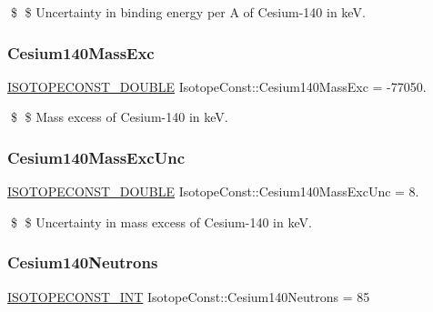 \$ \$ Uncertainty in binding energy per A of Cesium-\/140 in keV. \mbox{\label{group___isotope_const-_cesium-_cs140_ga203c6fac2efbd5713f63a1fd1f63b3dd}} 
\subsubsection{\texorpdfstring{Cesium140\+Mass\+Exc}{Cesium140MassExc}}
{\footnotesize\ttfamily \mbox{\hyperlink{group___isotope_const-_macros_ga8f45a7272ce02c0b4c65c44636ed719a}{I\+S\+O\+T\+O\+P\+E\+C\+O\+N\+S\+T\+\_\+\+D\+O\+U\+B\+LE}} Isotope\+Const\+::\+Cesium140\+Mass\+Exc = -\/77050.}

\$ \$ Mass excess of Cesium-\/140 in keV. \mbox{\label{group___isotope_const-_cesium-_cs140_ga5ecd7ad0714c77532ffbe5cf794a797b}} 
\subsubsection{\texorpdfstring{Cesium140\+Mass\+Exc\+Unc}{Cesium140MassExcUnc}}
{\footnotesize\ttfamily \mbox{\hyperlink{group___isotope_const-_macros_ga8f45a7272ce02c0b4c65c44636ed719a}{I\+S\+O\+T\+O\+P\+E\+C\+O\+N\+S\+T\+\_\+\+D\+O\+U\+B\+LE}} Isotope\+Const\+::\+Cesium140\+Mass\+Exc\+Unc = 8.}

\$ \$ Uncertainty in mass excess of Cesium-\/140 in keV. \mbox{\label{group___isotope_const-_cesium-_cs140_ga8377eaab47f517d53786aca6b349ace2}} 
\subsubsection{\texorpdfstring{Cesium140\+Neutrons}{Cesium140Neutrons}}
{\footnotesize\ttfamily \mbox{\hyperlink{group___isotope_const-_macros_ga5f18360b3e99483a35c32d789e62621c}{I\+S\+O\+T\+O\+P\+E\+C\+O\+N\+S\+T\+\_\+\+I\+NT}} Isotope\+Const\+::\+Cesium140\+Neutrons = 85}

